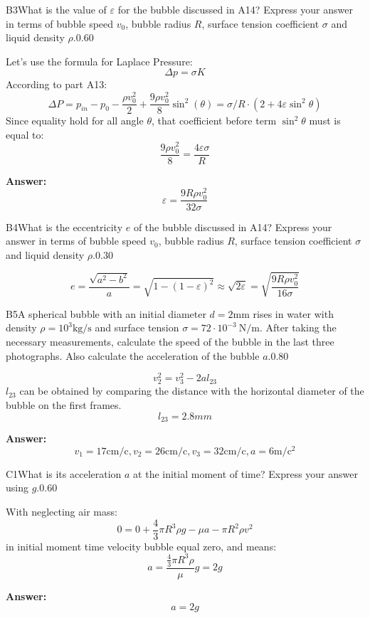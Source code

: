 \documentclass[11pt,a4paper]{article}
\begin{document}
\begin{solcard}{B3}{What is the value of $\varepsilon$ for the bubble discussed in A14? Express your answer in terms of bubble speed $v_0$, bubble radius $R$, surface tension coefficient $\sigma$ and liquid density $\rho$.}{0.60}

Let's use the formula for Laplace Pressure: $$\Delta p = \sigma K$$According to part A13: $$\Delta P = p_{in} - p_0 - \frac{\rho v_0^2}{2} + \frac{9\rho v_0^2}{8} \sin^2(\theta) = \sigma /R \cdot ( 2 + 4\varepsilon \sin^2{\theta})$$Since equality hold for all angle $\theta$, that coefficient before term $\sin^2{\theta}$ must is equal to: $$\frac{9\rho v_0^2}{8} = \frac{4\varepsilon \sigma}{R}$$

\par\smallskip\noindent\textbf{Answer:} $$ \varepsilon   = \frac{9R\rho v_0^2}{32\sigma}$$
\end{solcard}

\begin{solcard}{B4}{What is the eccentricity $e$ of the bubble discussed in A14? Express your answer in terms of bubble speed $v_0$, bubble radius $R$, surface tension coefficient $\sigma$ and liquid density $\rho$.}{0.30}

$$e = \frac{\sqrt{a^2 - b^2}}{a} = \sqrt{1-(1-\varepsilon)^2} \approx \sqrt{2\varepsilon} =  \sqrt{\frac{9R\rho v_0^2}{16\sigma}}$$

\end{solcard}

\begin{solcard}{B5}{A spherical bubble with an initial diameter $d = 2\text{mm}$ rises in water with density $\rho = 10^3 \text{kg}/\text{s}$ and surface tension $\sigma = 72 \cdot 10^{-3} ~\text{N}/\text{m}$. After taking the necessary measurements, calculate the speed of the bubble in the last three photographs. Also calculate the acceleration of the bubble $a$.}{0.80}

$$v_2^2=v_3^2-2al_{23}$$ $l_{23}$ can be obtained by comparing the distance with the horizontal diameter of the bubble on the first frames. $$l_{23}=2.8 mm$$

\par\smallskip\noindent\textbf{Answer:} $$v_1=17\text{cm}/\text{c}, v_2=26\text{cm}/\text{c}, v_3=32\text{cm}/\text{c}, a = 6 \text{m}/\text{c}^2$$
\end{solcard}

\begin{solcard}{C1}{What is its acceleration $a$ at the initial moment of time? Express your answer using $g$.}{0.60}

With neglecting air mass: $$0 = 0 + \frac{4}{3}\pi R^3 \rho g - \mu a - \pi R^2 \rho v^2$$in initial moment time velocity bubble equal zero, and means: $$a = \frac{\frac{4}{3}\pi R^3 \rho}{\mu} g = 2g$$

\par\smallskip\noindent\textbf{Answer:} $$a  = 2g$$
\end{solcard}
\end{document}
